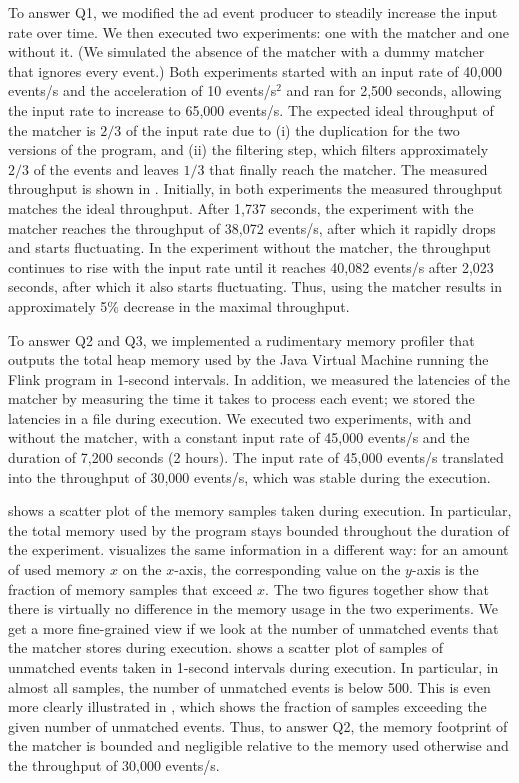 To answer Q1, we modified the ad event producer to steadily increase
the input rate over time. We then executed two experiments: one with the
matcher and one without it. (We simulated the absence of the
matcher with a dummy matcher that ignores every event.) Both
experiments started with an input rate of 40,000 events/s and
the acceleration of 10 events/s$^2$ and ran for 2,500 seconds, allowing the
input rate to increase to 65,000 events/s. The expected ideal throughput of
the matcher is $2/3$ of the input rate due to (i) the duplication
for the two versions of the program, and (ii) the filtering step, which filters
approximately $2/3$ of the events and leaves $1/3$ that finally reach
the matcher. The measured throughput is shown in .
Initially, in both experiments the measured throughput matches the ideal
throughput. After 1,737 seconds, the experiment with the matcher reaches
the throughput of 38,072 events/s, after which it rapidly drops and starts
fluctuating. In the experiment without the matcher, the throughput continues
to rise with the input rate until it reaches 40,082 events/s after 2,023 seconds,
after which it also starts fluctuating. Thus, using the matcher results in
approximately 5\% decrease in the maximal throughput.

To answer Q2 and Q3, we implemented a rudimentary memory profiler
that outputs the total heap memory used by the Java Virtual Machine running
the Flink program in 1-second intervals. In addition, we measured the
latencies of the matcher by measuring the time it takes to process each
event; we stored the latencies in a file during execution. We executed
two experiments, with and without the matcher, with a constant input rate
of 45,000 events/s and the duration of 7,200 seconds (2 hours). The input
rate of 45,000 events/s translated into the throughput of 30,000 events/s,
which was stable during the execution.

 shows a scatter plot of the memory samples taken
during execution. In particular, the total memory used by the program
stays bounded throughout the duration of the experiment. 
visualizes the same information in a different way: for an amount of used
memory $x$ on the $x$-axis, the corresponding value on the $y$-axis is
the fraction of memory samples that exceed $x$. The two figures together
show that there is virtually no difference in the memory usage in the two
experiments.
We get a more fine-grained view if we look at the number of unmatched events
that the matcher stores during execution.  shows
a scatter plot of samples of unmatched events taken in 1-second intervals
during execution. In particular, in almost all samples, the number of unmatched
events is below 500. This is even more clearly illustrated in
, which shows the fraction of samples exceeding
the given number of unmatched events. Thus, to answer Q2, the memory
footprint of the matcher is bounded and negligible relative to the memory
used otherwise and the throughput of 30,000 events/s.

